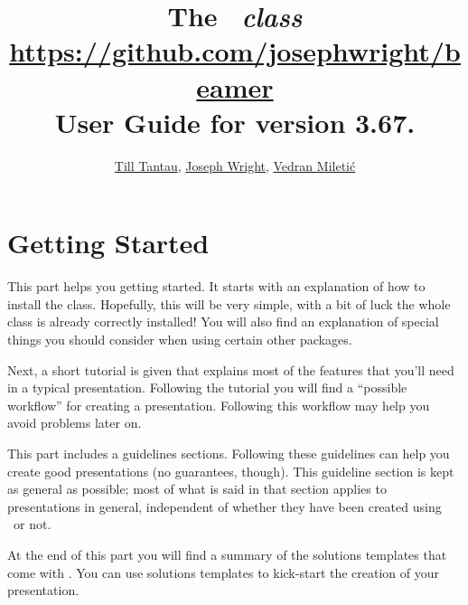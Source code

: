 \documentclass{ltxdoc}
\def\beamerugversion{3.67}
\begin{document}

\title{\Huge The \beamer\ \textit{class}\\
\Large\url{https://github.com/josephwright/beamer}\\
\Large User Guide for version \beamerugversion.}
\author{\href{mailto:tantau@users.sourceforge.net}{Till Tantau}, \href{mailto:joseph.wright@morningstar2.co.uk}{Joseph Wright}, \href{mailto:vmiletic@inf.uniri.hr}{Vedran Mileti\'c}}

\maketitle

\tableofcontents






\part{Getting Started}

This part helps you getting started. It starts with an explanation of how to install the class. Hopefully, this will be very simple, with a bit of luck the whole class is already correctly installed! You will also find an explanation of special things you should consider when using certain other packages.

Next, a short tutorial is given that explains most of the features that you'll need in a typical presentation. Following the tutorial you will find a ``possible workflow'' for creating a presentation. Following this workflow may help you avoid problems later on.

This part includes a guidelines sections. Following these guidelines can help you create good presentations (no guarantees, though). This guideline section is kept as general as possible; most of what is said in that section applies to presentations in general, independent of whether they have been created using \beamer\ or not.

At the end of this part you will find a summary of the solutions templates that come with \beamer. You can use solutions templates to kick-start the creation of your presentation.
\end{document}

